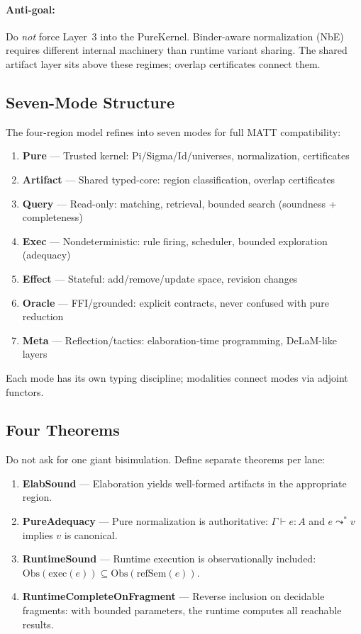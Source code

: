 \documentclass[11pt]{article}
\begin{document}
\paragraph{Anti-goal:} Do \emph{not} force Layer~3 into the PureKernel.
Binder-aware normalization (NbE) requires different internal machinery
than runtime variant sharing.  The shared artifact layer sits above
these regimes; overlap certificates connect them.

\subsection{Seven-Mode Structure}

The four-region model refines into seven modes for full MATT compatibility:

\begin{enumerate}
\item \textbf{Pure} --- Trusted kernel: Pi/Sigma/Id/universes, normalization, certificates
\item \textbf{Artifact} --- Shared typed-core: region classification, overlap certificates
\item \textbf{Query} --- Read-only: matching, retrieval, bounded search (soundness + completeness)
\item \textbf{Exec} --- Nondeterministic: rule firing, scheduler, bounded exploration (adequacy)
\item \textbf{Effect} --- Stateful: add/remove/update space, revision changes
\item \textbf{Oracle} --- FFI/grounded: explicit contracts, never confused with pure reduction
\item \textbf{Meta} --- Reflection/tactics: elaboration-time programming, DeLaM-like layers
\end{enumerate}

Each mode has its own typing discipline; modalities connect modes via
adjoint functors.

\subsection{Four Theorems}

Do not ask for one giant bisimulation.  Define separate theorems per lane:

\begin{enumerate}
\item \textbf{ElabSound} --- Elaboration yields well-formed artifacts in the
      appropriate region.
\item \textbf{PureAdequacy} --- Pure normalization is authoritative:
      $\Gamma \vdash e : A$ and $e \leadsto^* v$ implies $v$ is canonical.
\item \textbf{RuntimeSound} --- Runtime execution is observationally included:
      $\mathrm{Obs}(\mathrm{exec}(e)) \subseteq \mathrm{Obs}(\mathrm{refSem}(e))$.
\item \textbf{RuntimeCompleteOnFragment} --- Reverse inclusion on decidable fragments:
      with bounded parameters, the runtime computes all reachable results.
\end{enumerate}
\end{document}
